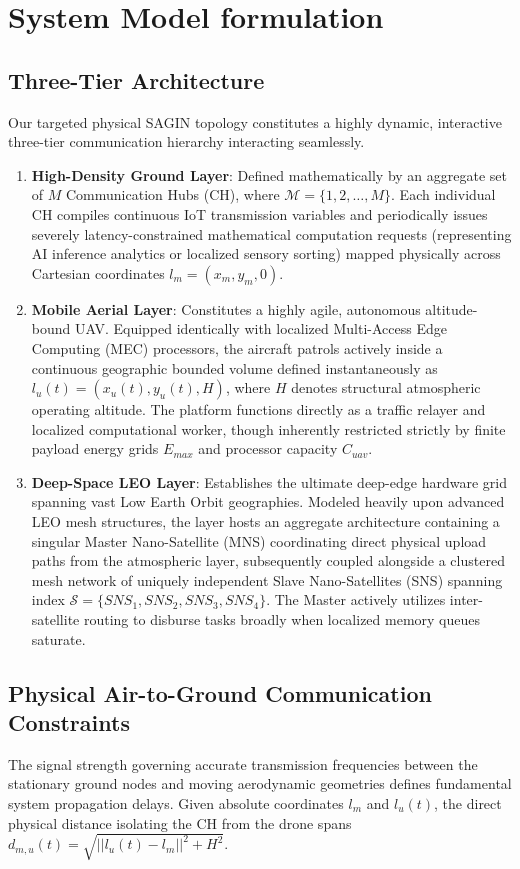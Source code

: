 \documentclass[conference]{IEEEtran}
\begin{document}
\section{System Model formulation}

\subsection{Three-Tier Architecture}
Our targeted physical SAGIN topology constitutes a highly dynamic, interactive three-tier communication hierarchy interacting seamlessly.
\begin{enumerate}
    \item \textbf{High-Density Ground Layer}: Defined mathematically by an aggregate set of $M$ Communication Hubs (CH), where $\mathcal{M} = \{1, 2, \dots, M\}$. Each individual CH compiles continuous IoT transmission variables and periodically issues severely latency-constrained mathematical computation requests (representing AI inference analytics or localized sensory sorting) mapped physically across Cartesian coordinates $l_m = (x_m, y_m, 0)$.
    \item \textbf{Mobile Aerial Layer}: Constitutes a highly agile, autonomous altitude-bound UAV. Equipped identically with localized Multi-Access Edge Computing (MEC) processors, the aircraft patrols actively inside a continuous geographic bounded volume defined instantaneously as $l_u(t) = (x_u(t), y_u(t), H)$, where $H$ denotes structural atmospheric operating altitude. The platform functions directly as a traffic relayer and localized computational worker, though inherently restricted strictly by finite payload energy grids $E_{max}$ and processor capacity $C_{uav}$.
    \item \textbf{Deep-Space LEO Layer}: Establishes the ultimate deep-edge hardware grid spanning vast Low Earth Orbit geographies. Modeled heavily upon advanced LEO mesh structures, the layer hosts an aggregate architecture containing a singular Master Nano-Satellite (MNS) coordinating direct physical upload paths from the atmospheric layer, subsequently coupled alongside a clustered mesh network of uniquely independent Slave Nano-Satellites (SNS) spanning index $\mathcal{S} = \{SNS_{1}, SNS_{2}, SNS_{3}, SNS_{4}\}$. The Master actively utilizes inter-satellite routing to disburse tasks broadly when localized memory queues saturate.
\end{enumerate}

\subsection{Physical Air-to-Ground Communication Constraints}
The signal strength governing accurate transmission frequencies between the stationary ground nodes and moving aerodynamic geometries defines fundamental system propagation delays. Given absolute coordinates $l_m$ and $l_u(t)$, the direct physical distance isolating the CH from the drone spans $d_{m,u}(t) = \sqrt{|| l_u(t) - l_m ||^2 + H^2}$. 
\end{document}
